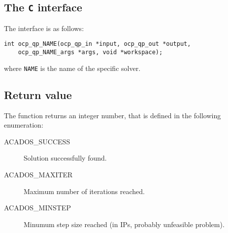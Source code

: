 \documentclass{report}
\begin{document}
\subsection{The \texttt{C} interface}
The interface is as follows:
\begin{verbatim}
int ocp_qp_NAME(ocp_qp_in *input, ocp_qp_out *output,
    ocp_qp_NAME_args *args, void *workspace);
\end{verbatim}
where \texttt{NAME} is the name of the specific solver.

\subsection{Return value}
The function returns an integer number, that is defined in the following enumeration:
\begin{description}
	\item[ACADOS\_SUCCESS] Solution successfully found.
	\item[ACADOS\_MAXITER] Maximum number of iterations reached.
	\item[ACADOS\_MINSTEP] Minumum step size reached (in IPs, probably unfeasible problem).
\end{description}
\end{document}
